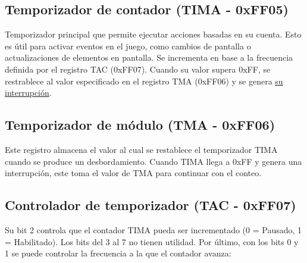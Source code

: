 \subsection{Temporizador de contador (TIMA - 0xFF05)}
Temporizador principal que permite ejecutar acciones basadas en su cuenta. Esto es útil para activar eventos en el juego, como cambios de pantalla o actualizaciones de elementos en pantalla. Se incrementa en base a la frecuencia definida por el registro TAC (0xFF07). Cuando su valor supera 0xFF, se restrablece al valor especificado en el registro TMA (0xFF06) y se genera \hyperref[interrupttype]{su interrupción}.

\subsection{Temporizador de módulo (TMA - 0xFF06)}
Este registro almacena el valor al cual se restablece el temporizador TIMA cuando se produce un desbordamiento. Cuando TIMA llega a 0xFF y genera una interrupción, este toma el valor de TMA para continuar con el conteo.

\subsection{Controlador de temporizador (TAC - 0xFF07)}
Su bit 2 controla que el contador TIMA pueda ser incrementado (0 = Pausado, 1 = Habilitado). Los bits del 3 al 7 no tienen utilidad. Por último, con los bits 0 y 1 se puede controlar la frecuencia a la que el contador avanza:

\begin{table}[h!]
    \centering
    \caption{Selección de modos de reloj y sus frecuencias.}
\end{table}

